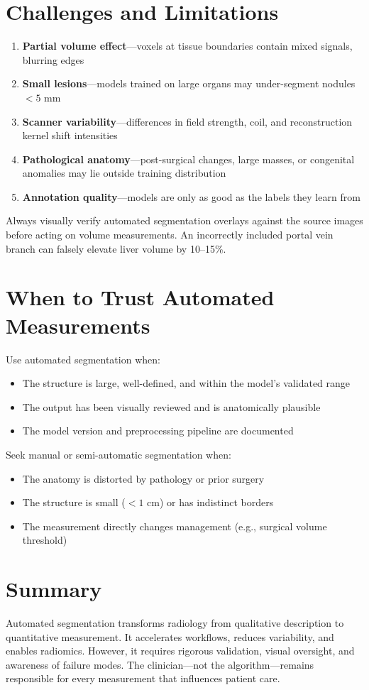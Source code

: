 \section{Challenges and Limitations}
\begin{enumerate}
    \item \textbf{Partial volume effect}---voxels at tissue boundaries contain mixed signals, blurring edges
    \item \textbf{Small lesions}---models trained on large organs may under-segment nodules $<5$ mm
    \item \textbf{Scanner variability}---differences in field strength, coil, and reconstruction kernel shift intensities
    \item \textbf{Pathological anatomy}---post-surgical changes, large masses, or congenital anomalies may lie outside training distribution
    \item \textbf{Annotation quality}---models are only as good as the labels they learn from
\end{enumerate}

\begin{pearlbox}
Always visually verify automated segmentation overlays against the source images before acting on volume measurements. An incorrectly included portal vein branch can falsely elevate liver volume by 10--15\%.
\end{pearlbox}

\section{When to Trust Automated Measurements}
Use automated segmentation when:
\begin{itemize}
    \item The structure is large, well-defined, and within the model's validated range
    \item The output has been visually reviewed and is anatomically plausible
    \item The model version and preprocessing pipeline are documented
\end{itemize}
Seek manual or semi-automatic segmentation when:
\begin{itemize}
    \item The anatomy is distorted by pathology or prior surgery
    \item The structure is small ($<1$ cm) or has indistinct borders
    \item The measurement directly changes management (e.g., surgical volume threshold)
\end{itemize}

\section{Summary}
Automated segmentation transforms radiology from qualitative description to quantitative measurement. It accelerates workflows, reduces variability, and enables radiomics. However, it requires rigorous validation, visual oversight, and awareness of failure modes. The clinician---not the algorithm---remains responsible for every measurement that influences patient care.

\clearpage
